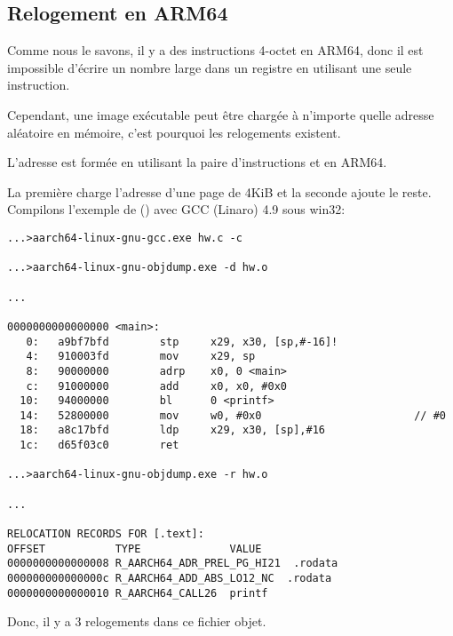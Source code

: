 ﻿\newcommand{\ARMELF}{\InSqBrackets{\emph{ELF for the ARM 64-bit Architecture (AArch64)}, (2013)}\footnote{\AlsoAvailableAs \url{http://infocenter.arm.com/help/topic/com.arm.doc.ihi0056b/IHI0056B_aaelf64.pdf}}}

\subsection{Relogement en ARM64}
\label{ARM64_relocs}

Comme nous le savons, il y a des instructions 4-octet en ARM64, donc il est impossible
d'écrire un nombre large dans un registre en utilisant une seule instruction.

Cependant, une image exécutable peut être chargée à n'importe quelle adresse aléatoire
en mémoire, c'est pourquoi les relogements existent.


L'adresse est formée en utilisant la paire d'instructions  et \ADD en ARM64.

La première charge l'adresse d'une page de 4KiB et la seconde ajoute le reste.
Compilons l'exemple de \q{\HelloWorldSectionName} () avec GCC (Linaro)
4.9 sous win32:

\begin{lstlisting}[caption=GCC (Linaro) 4.9 et objdump du fichier objet,style=customasmARM]
...>aarch64-linux-gnu-gcc.exe hw.c -c

...>aarch64-linux-gnu-objdump.exe -d hw.o

...

0000000000000000 <main>:
   0:   a9bf7bfd        stp     x29, x30, [sp,#-16]!
   4:   910003fd        mov     x29, sp
   8:   90000000        adrp    x0, 0 <main>
   c:   91000000        add     x0, x0, #0x0
  10:   94000000        bl      0 <printf>
  14:   52800000        mov     w0, #0x0                        // #0
  18:   a8c17bfd        ldp     x29, x30, [sp],#16
  1c:   d65f03c0        ret

...>aarch64-linux-gnu-objdump.exe -r hw.o

...

RELOCATION RECORDS FOR [.text]:
OFFSET           TYPE              VALUE
0000000000000008 R_AARCH64_ADR_PREL_PG_HI21  .rodata
000000000000000c R_AARCH64_ADD_ABS_LO12_NC  .rodata
0000000000000010 R_AARCH64_CALL26  printf
\end{lstlisting}

Donc, il y a 3 relogements dans ce fichier objet.

